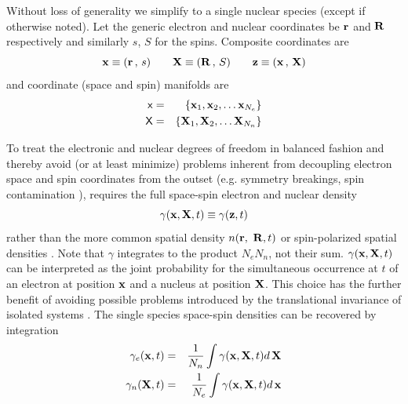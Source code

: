 Without loss of generality we simplify to a single nuclear species (except
if otherwise noted). Let the generic electron and nuclear coordinates be $%
{\bf r}$ and ${\bf R}$ respectively and similarly $s$, $S$ for the spins.
Composite coordinates are 
\begin{equation}
{\bf x} \equiv ( {\bf r} \, , \, s ) \qquad {\bf X} \equiv ( {\bf R} \, , \,
S ) \qquad {\bf z} \equiv ( {\bf x} \, , \, {\bf X} )
\end{equation}
and coordinate (space and spin) manifolds are 
\begin{eqnarray}
{\sf x} & = & \{ {\bf x}_{1},{\bf x}_{2}, \ldots {\bf x}_{N_{e}} \} 
\nonumber \\
{\sf X} & = & \{ {\bf X}_{1},{\bf X}_{2}, \ldots {\bf X}_{N_{n}} \}
\label{manifdef}
\end{eqnarray}

To treat the electronic and nuclear degrees of freedom in balanced fashion
and thereby avoid (or at least minimize) problems inherent from decoupling
electron space and spin coordinates from the outset (e.g. symmetry
breakings, spin contamination \cite{PerdewSavin,BLWSBT98,SavinSem2}),
requires the full space-spin electron and nuclear density 
\begin{equation}
\gamma ({\bf x},{\bf X},t)\equiv \gamma ({\bf z},t)  \label{gammadef}
\end{equation}
rather than the more common spatial density $n({\bf r},{\bf \ R},t)$ or
spin-polarized spatial densities \cite{spinpol}. Note that $\gamma $
integrates to the product $N_{e}N_{n}$, not their sum. $\gamma ({\bf x},{\bf %
X},t)$ can be interpreted as the joint probability for the simultaneous
occurrence at $t$ of an electron at position ${\bf x}$ and a nucleus at
position ${\bf X}$. This choice has the further benefit of avoiding possible
problems introduced by the translational invariance of isolated systems \cite%
{KreibGross}. The single species space-spin densities can be recovered by
integration 
\begin{eqnarray}
\gamma _{e}({\bf x},t) &=&\frac{1}{N_{n}}\int \gamma ({\bf x},{\bf X},t)d\,%
{\bf X}  \nonumber \\
\gamma _{n}({\bf X},t) &=&\frac{1}{N_{e}}\int \gamma ({\bf x},{\bf X},t)d\,%
{\bf x}
\end{eqnarray}

